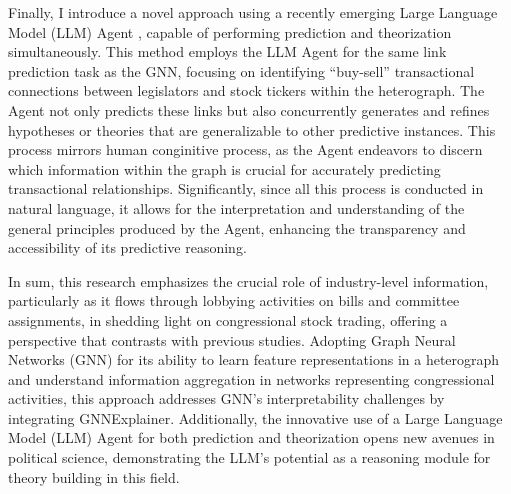 \documentclass[15pt,letterpaper]{article}
\begin{document}
Finally, I introduce a novel approach using a recently emerging Large Language Model (LLM) Agent \citep{shinn2023reflexion, wang2023voyager, park2022social}, capable of performing prediction and theorization simultaneously. This method employs the LLM Agent for the same link prediction task as the GNN, focusing on identifying “buy-sell” transactional connections between legislators and stock tickers within the heterograph. The Agent not only predicts these links but also concurrently generates and refines hypotheses or theories that are generalizable to other predictive instances. This process mirrors human conginitive process, as the Agent endeavors to discern which information within the graph is crucial for accurately predicting transactional relationships. Significantly, since all this process is conducted in natural language, it allows for the interpretation and understanding of the general principles produced by the Agent, enhancing the transparency and accessibility of its predictive reasoning.

In sum, this research emphasizes the crucial role of industry-level information, particularly as it flows through lobbying activities on bills and committee assignments, in shedding light on congressional stock trading, offering a perspective that contrasts with previous studies. Adopting Graph Neural Networks (GNN) for its ability to learn feature representations in a heterograph and understand information aggregation in networks representing congressional activities, this approach addresses GNN's interpretability challenges by integrating GNNExplainer. Additionally, the innovative use of a Large Language Model (LLM) Agent for both prediction and theorization opens new avenues in political science, demonstrating the LLM's potential as a reasoning module for theory building in this field. 





\end{document}
